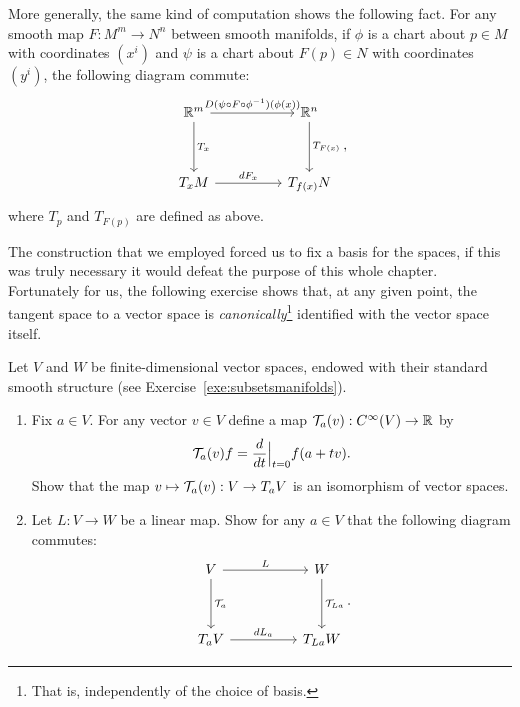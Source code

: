 More generally, the same kind of computation shows the following fact. For any smooth map $F:M^m \to N^n$ between smooth manifolds, if $\phi$ is a chart about $p\in M$ with coordinates $(x^i)$ and $\psi$ is a chart about $F(p)\in N$ with coordinates $(y^i)$, the following diagram commute:
\begin{equation}
  \begin{tikzcd}[row sep=huge, column sep=huge]
    \R^m \arrow[r, "D(\psi \circ F \circ \phi^{-1})(\phi(x))"] \arrow[d, "T_x"]
    & \R^n \arrow[d, "T_{F(x)}"] \\
    T_xM \arrow[r, "dF_x"]
    & T_{f(x)}N
  \end{tikzcd},
\end{equation}
where $T_p$ and $T_{F(p)}$ are defined as above.

The construction that we employed forced us to fix a basis for the spaces, if this was truly necessary it would defeat the purpose of this whole chapter.
Fortunately for us, the following exercise shows that, at any given point, the tangent space to a vector space is \emph{canonically}\footnote{That is, independently of the choice of basis.} identified with the vector space itself.

\begin{exercise}\label{ex:tg_curve_iso}
  Let $V$ and $W$ be finite-dimensional vector spaces, endowed with their standard smooth structure (see Exercise~\ref{exe:subsetsmanifolds}).
  \begin{enumerate}
    \item Fix $a\in V$. For any vector $v\in V$ define a map $\mathcal{T}_a(v) : C^\infty(V) \to \mathbb{R}$ by
    \begin{equation}
      \mathcal{T}_a(v) f = \frac{d}{dt}\Big|_{t=0} f(a + tv).
    \end{equation}
    Show that the map $v\mapsto \mathcal{T}_a(v) : V \to T_aV$ is an isomorphism of vector spaces.
    \item Let $L:V\to W$ be a linear map. Show for any $a\in V$ that the following diagram commutes:
    \begin{equation}
    \begin{tikzcd}[row sep=huge, column sep=huge]
      V \arrow[r, "L"] \arrow[d, "\cT_a"]
      & W \arrow[d, "\cT_{La}"] \\
      T_aV \arrow[r, "dL_a"]
      & T_{La}W
    \end{tikzcd}.
  \end{equation}
  \end{enumerate}
\end{exercise}

